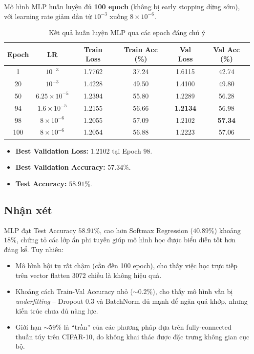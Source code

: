 \documentclass[a4paper]{article}
\theoremstyle{definition}
\begin{document}
Mô hình MLP huấn luyện đủ \textbf{100 epoch} (không bị early stopping dừng sớm), với learning rate giảm dần từ $10^{-3}$ xuống $8 \times 10^{-6}$.

\begin{table}[H]
	\centering
	\caption{Kết quả huấn luyện MLP qua các epoch đáng chú ý}
	\footnotesize
	\begin{tabular}{|c|c|c|c|c|c|}
		\hline
		\textbf{Epoch} & \textbf{LR} & \textbf{Train Loss} & \textbf{Train Acc (\%)} & \textbf{Val Loss} & \textbf{Val Acc (\%)} \\ \hline
		1   & $10^{-3}$   & 1.7762 & 37.24 & 1.6115 & 42.74 \\ \hline
		20  & $10^{-3}$   & 1.4228 & 49.50 & 1.4100 & 49.80 \\ \hline
		50  & $6.25 \times 10^{-5}$ & 1.2394 & 55.80 & 1.2289 & 56.28 \\ \hline
		94  & $1.6 \times 10^{-5}$  & 1.2155 & 56.66 & \textbf{1.2134} & 56.98 \\ \hline
		98  & $8 \times 10^{-6}$    & 1.2055 & 57.09 & 1.2102 & \textbf{57.34} \\ \hline
		100 & $8 \times 10^{-6}$    & 1.2054 & 56.88 & 1.2223 & 57.06 \\ \hline
	\end{tabular}
	\label{tab:mlp-results}
\end{table}

\begin{itemize}
	\item \textbf{Best Validation Loss:} 1.2102 tại Epoch 98.
	\item \textbf{Best Validation Accuracy:} 57.34\%.
	\item \textbf{Test Accuracy:} $\mathbf{58.91\%}$.
\end{itemize}

\subsection{Nhận xét}
MLP đạt Test Accuracy $58.91\%$, cao hơn Softmax Regression ($40.89\%$) khoảng $18\%$, chứng tỏ các lớp ẩn phi tuyến giúp mô hình học được biểu diễn tốt hơn đáng kể. Tuy nhiên:

\begin{itemize}
	\item Mô hình hội tụ rất chậm (cần đến 100 epoch), cho thấy việc học trực tiếp trên vector flatten $3072$ chiều là không hiệu quả.
	\item Khoảng cách Train-Val Accuracy nhỏ ($\sim 0.2\%$), cho thấy mô hình vẫn bị \textit{underfitting} -- Dropout $0.3$ và BatchNorm đủ mạnh để ngăn quá khớp, nhưng kiến trúc chưa đủ năng lực.
	\item Giới hạn $\sim 59\%$ là ``trần'' của các phương pháp dựa trên fully-connected thuần túy trên CIFAR-10, do không khai thác được đặc trưng không gian cục bộ.
\end{itemize}
\end{document}
